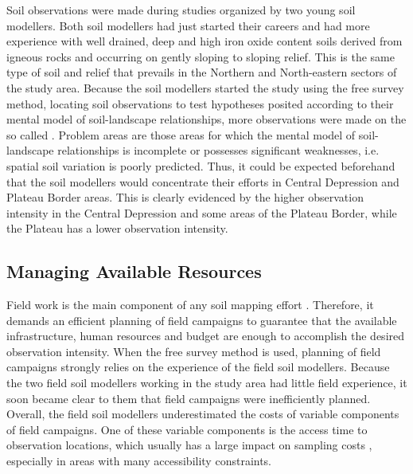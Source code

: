 Soil observations were made during studies organized by two young soil modellers. Both soil modellers had just 
started their careers and had more experience with well drained, deep and high iron oxide content soils 
derived from igneous rocks and occurring on gently sloping to sloping relief. This is the same type of soil and
relief that prevails in the Northern and North-eastern sectors of the study area. Because the soil 
modellers started the study using the free survey method, locating soil observations to test hypotheses 
posited according to their mental model of soil-landscape relationships, more observations were made on the so 
called  \cite{Rossiter2000}. Problem areas are those areas for which the mental model of 
soil-landscape relationships is incomplete or possesses significant weaknesses, i.e. spatial soil variation is 
poorly predicted. Thus, it could be expected beforehand that the soil modellers would concentrate their 
efforts in Central Depression and Plateau Border areas. This is clearly evidenced by the higher observation 
intensity in the Central Depression and some areas of the Plateau Border, while the Plateau has a lower 
observation intensity.

\subsection{Managing Available Resources}

Field work is the main component of any soil mapping effort \cite{KempenEtAl2012}. Therefore, it demands an 
efficient planning of field campaigns to guarantee that the available infrastructure, human resources and 
budget are enough to accomplish the desired observation intensity. When the free survey method is used, 
planning of field campaigns strongly relies on the experience of the field soil modellers. Because the two 
field soil modellers working in the study area had little field experience, it soon became clear to them
that field campaigns were inefficiently planned. Overall, the field soil modellers underestimated the costs of
variable components of field campaigns. One of these variable components is the access time to observation 
locations, which usually has a large impact on sampling costs \cite{DomburgEtAl1997}, especially in areas with 
many accessibility constraints.

